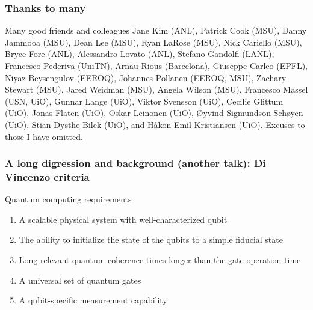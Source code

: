 \documentclass[aspectratio=169,10pt]{beamer}
\begin{document}
\begin{frame}
\frametitle{Thanks to many}

\begin{alertblock}{Many good friends and colleagues}
Jane Kim (ANL), Patrick Cook (MSU), Danny Jammooa (MSU), Dean Lee (MSU), Ryan LaRose (MSU), Nick Cariello (MSU), Bryce Fore (ANL), Alessandro Lovato (ANL), Stefano Gandolfi (LANL), Francesco Pederiva (UniTN), Arnau Rious (Barcelona), Giuseppe Carleo (EPFL), 
Niyaz Beysengulov (EEROQ), Johannes Pollanen (EEROQ, MSU), Zachary Stewart (MSU), Jared Weidman (MSU), Angela Wilson (MSU), Francesco Massel (USN, UiO), Gunnar Lange (UiO), Viktor Svensson (UiO), Cecilie Glittum (UiO),
Jonas Flaten (UiO), Oskar Leinonen (UiO), Øyvind Sigmundson Schøyen (UiO), Stian Dysthe Bilek (UiO), and Håkon Emil Kristiansen (UiO). Excuses to those I have omitted.
\end{alertblock}


\end{frame}



\begin{frame}
\frametitle{A long digression and background (another talk): Di Vincenzo criteria}

\begin{alertblock}{Quantum computing requirements }
\begin{enumerate}
\item A scalable physical system with well-characterized qubit

\item The ability to initialize the state of the qubits to a simple fiducial state

\item Long relevant quantum coherence times longer than the gate operation time

\item A universal set of quantum gates

\item A qubit-specific measurement capability
\end{enumerate}
\end{alertblock}
\end{frame}
\end{document}
